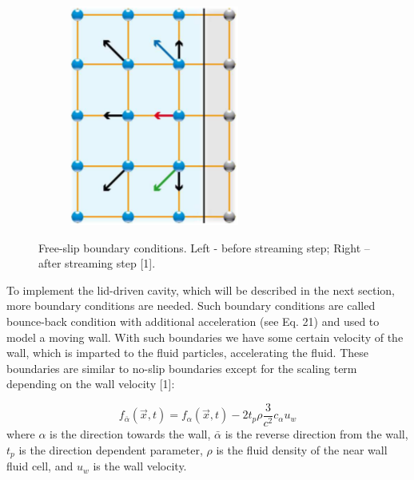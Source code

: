 \begin{figure}[H]
\begin{subfigure}[h]{0.3\textwidth}
    \includegraphics[width=\textwidth]{img/fig9-2.png}
  \end{subfigure}
  \caption{Free-slip boundary conditions. Left - before streaming step; Right – after streaming step [1].}
\end{figure}

To implement the lid-driven cavity, which will be described in the next section, more boundary conditions are needed. Such boundary conditions are called bounce-back condition with additional acceleration (see Eq. 21) and used to model a moving wall. With such boundaries we have some certain velocity of the wall, which is imparted to the fluid particles, accelerating the fluid. These boundaries are similar to no-slip boundaries except for the scaling term depending on the wall velocity [1]:

\begin{equation}
f_{\bar{\alpha}}(\vec{x},t) = f_{\alpha}(\vec{x},t) - 2 t_p \rho \frac{3}{c^2} c_{\alpha} u_{w}
\end{equation}
where $\alpha$ is the direction towards the wall, $\bar{\alpha}$ is the reverse direction from the wall, $t_p$ is the direction dependent parameter, $\rho$ is the fluid density of the near wall fluid cell, and $u_w$ is the wall velocity.
